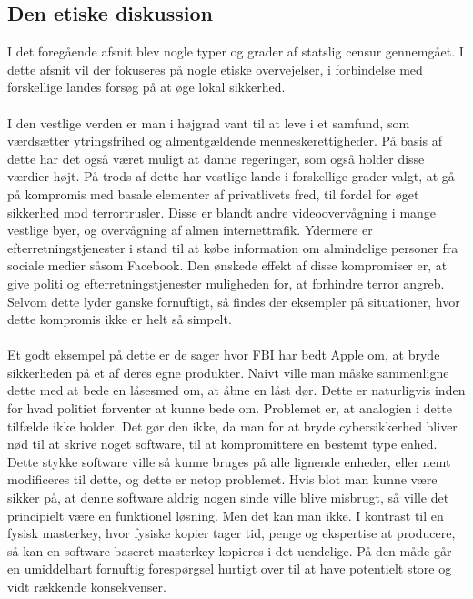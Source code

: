 \subsection{Den etiske diskussion}
I det foregående afsnit blev nogle typer og grader af statslig censur gennemgået. I dette afsnit vil der fokuseres på nogle etiske overvejelser, i forbindelse med forskellige landes forsøg på at øge lokal sikkerhed. 
\\\\
\noindent
I den vestlige verden er man i højgrad vant til at leve i et samfund, som værdsætter ytringsfrihed og almentgældende menneskerettigheder. På basis af dette har det også været muligt at danne regeringer, som også holder disse værdier højt. På trods af dette har vestlige lande i forskellige grader valgt, at gå på kompromis med basale elementer af privatlivets fred, til fordel for øget sikkerhed mod terrortrusler. Disse er blandt andre videoovervågning i mange vestlige byer, og overvågning af almen internettrafik. Ydermere er efterretningstjenester i stand til at købe information om almindelige personer fra sociale medier såsom Facebook. Den ønskede effekt af disse kompromiser er, at give politi og efterretningstjenester muligheden for, at forhindre terror angreb. Selvom dette lyder ganske fornuftigt, så findes der eksempler på situationer, hvor dette kompromis ikke er helt så simpelt.\\\\
\noindent
Et godt eksempel på dette er de sager hvor FBI har bedt Apple om, at bryde sikkerheden på et af deres egne produkter\cite{FBI/Apple_encryption}. Naivt ville man måske sammenligne dette med at bede en låsesmed om, at åbne en låst dør. Dette er naturligvis inden for hvad politiet forventer at kunne bede om. Problemet er, at analogien i dette tilfælde ikke holder. Det gør den ikke, da man for at bryde cybersikkerhed bliver nød til at skrive noget software, til at kompromittere en bestemt type enhed. Dette stykke software ville så kunne bruges på alle lignende enheder, eller nemt modificeres til dette, og dette er netop problemet. Hvis blot man kunne være sikker på, at denne software aldrig nogen sinde ville blive misbrugt, så ville det principielt være en funktionel løsning. Men det kan man ikke. I kontrast til en fysisk masterkey, hvor fysiske kopier tager tid, penge og ekspertise at producere, så kan en software baseret masterkey kopieres i det uendelige. På den måde går en umiddelbart fornuftig forespørgsel hurtigt over til at have potentielt store og vidt rækkende konsekvenser.\\\\
